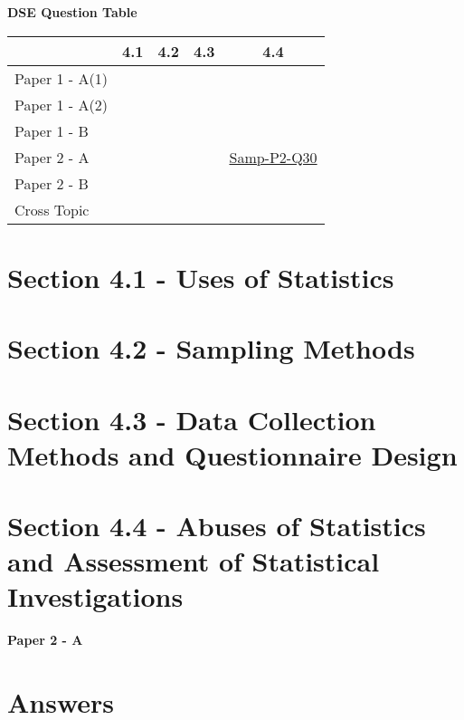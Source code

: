 \documentclass[12pt, a4paper]{article}
\begin{document}
\begin{absolutelynopagebreak}
\begin{center}
\textbf{DSE Question Table}
\end{center}
\begin{center}
\begin{tabular}{|l|c|c|c|c|}
\hline
        & 4.1 & 4.2 & 4.3 & 4.4 \\\hline
\hline
Paper 1 - A(1)&  &  &  &  \\
\hline
Paper 1 - A(2)&  &  &  &  \\
\hline
Paper 1 - B&  &  &  &  \\
\hline
\hline
Paper 2 - A&  &  &  & \hyperref[DSE2012S-CoreP2-Q30]{Samp-P2-Q30} \\
\hline
Paper 2 - B&  &  &  &  \\
\hline
\hline
Cross Topic&  &  &  &  \\
\hline
\end{tabular}
\end{center}
\end{absolutelynopagebreak}




\section*{Section 4.1 - Uses of Statistics}\label{section:6-4-1}





\section*{Section 4.2 - Sampling Methods}\label{section:6-4-2}





\section*{Section 4.3 - Data Collection Methods and Questionnaire Design}\label{section:6-4-3}





\section*{Section 4.4 - Abuses of Statistics and Assessment of Statistical Investigations}\label{section:6-4-4}

\textbf{Paper 2 - A}
\begin{enumx}[label=\arabic*.,start=1]
\item {}\label{DSE2012S-CoreP2-Q30} 
\end{enumx}
\section*{Answers}
\begin{enumx}[label=\arabic*.,start=1]
\item {}
\end{enumx}
\end{document}

